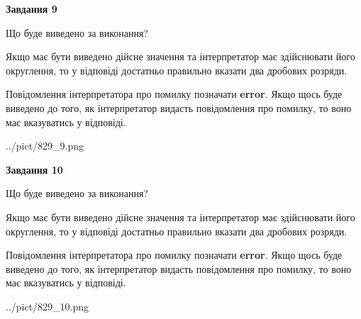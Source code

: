 \documentclass[12pt, ukrainian]{article}
\begin{document}
{\begin {Large}
{\begin {center}\textbf{Завдання 9}\end {center}}\par
Що буде виведено за виконання? \par

Якщо має бути виведено дійсне значення та інтерпретатор має здійснювати його округлення, 
то у відповіді достатньо правильно вказати два дробових розряди.

Повідомлення інтерпретатора про помилку позначати \textbf{error}.
Якщо щось буде виведено до того, як інтерпретатор видасть повідомлення про помилку, 
то воно має вказуватись у відповіді. \par

\begin{center}
	{../pict/829_9.png}
\end{center}
\newpage

{\begin {center}\textbf{Завдання 10}\end {center}}\par
Що буде виведено за виконання? \par

Якщо має бути виведено дійсне значення та інтерпретатор має здійснювати його округлення, 
то у відповіді достатньо правильно вказати два дробових розряди.

Повідомлення інтерпретатора про помилку позначати \textbf{error}.
Якщо щось буде виведено до того, як інтерпретатор видасть повідомлення про помилку, 
то воно має вказуватись у відповіді. \par

\begin{center}
	{../pict/829_10.png}
\end{center}
\newpage

\end {Large}}
\end{document}
